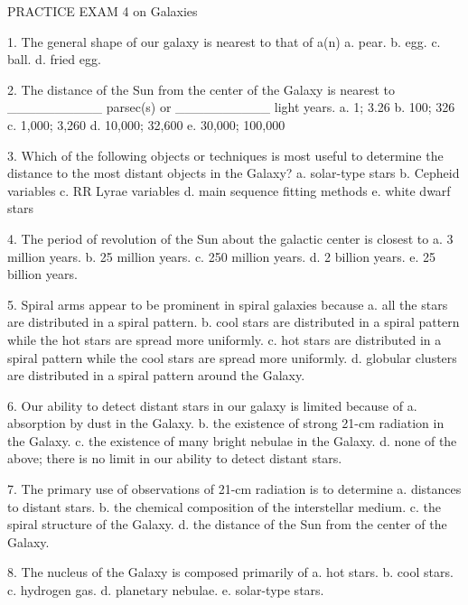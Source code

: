 

PRACTICE EXAM 4 on Galaxies
 
   1. The general shape of our galaxy is nearest to that of a(n)
      a.  pear.
      b.  egg.
      c.  ball.
      d.  fried egg.
      
   2. The distance of the Sun from the center of the Galaxy is
      nearest to __________ parsec(s) or __________ light years.
      a.  1; 3.26
      b.  100; 326
      c.  1,000; 3,260
      d.  10,000; 32,600
      e.  30,000; 100,000
         
   3. Which of the following objects or techniques is most useful to
      determine the distance to the most distant objects in the Galaxy?
      a.  solar-type stars
      b.  Cepheid variables
      c.  RR Lyrae variables
      d.  main sequence fitting methods
      e.  white dwarf stars
      
   4. The period of revolution of the Sun about the galactic center is closest to
      a.  3 million years.
      b.  25 million years.
      c.  250 million years.
      d.  2 billion years.
      e.  25 billion years.
      
   5. Spiral arms appear to be prominent in spiral galaxies because
      a.  all the stars are distributed in a spiral pattern.
      b.  cool stars are distributed in a spiral pattern while the
          hot stars are spread more uniformly.
      c.  hot stars are distributed in a spiral pattern while the
          cool stars are spread more uniformly.
      d.  globular clusters are distributed in a spiral pattern
          around the Galaxy.
      
   6. Our ability to detect distant stars in our galaxy is limited because of
      a.  absorption by dust in the Galaxy.
      b.  the existence of strong 21-cm radiation in the Galaxy.
      c.  the existence of many bright nebulae in the Galaxy.
      d.  none of the above; there is no limit in our ability to detect distant stars.
      
   7. The primary use of observations of 21-cm radiation is to determine
      a.  distances to distant stars.
      b.  the chemical composition of the interstellar medium.
      c.  the spiral structure of the Galaxy.
      d.  the distance of the Sun from the center of the Galaxy.
      
   8. The nucleus of the Galaxy is composed primarily of
      a.  hot stars.
      b.  cool stars.
      c.  hydrogen gas.
      d.  planetary nebulae.
      e.  solar-type stars.
      
